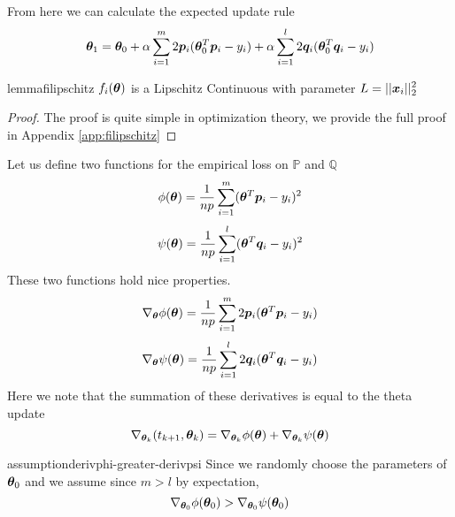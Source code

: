 \documentclass{article} %
\begin{document}
	From here we can calculate the expected update rule
	\begin{equation}
		{\bm{\theta}}_1 = {\bm{\theta}}_0 + \alpha\sum_{i=1}^m2{\bm{p}}_i({\bm{\theta}}^T_0{\bm{p}}_i -y_i) + \alpha\sum_{i=1}^l2{\bm{q}}_i({\bm{\theta}}^T_0{\bm{q}}_i - y_i)
	\end{equation}

	 
	
	\begin{restatable}{lemma}{filipschitz}
		\label{lem:filipschitz}
		$f_i({\bm{\theta}})$ is a Lipschitz Continuous with parameter $\displaystyle L = || {\bm{x}}_i || _2^2$
	\end{restatable}
	\begin{proof}
		The proof is quite simple in optimization theory, we provide the full proof in Appendix \ref{app:filipschitz}
	\end{proof}
	Let us define two functions for the empirical loss on $\mathbb{P}$ and $\mathbb{Q}$
	\begin{equation}
		\phi({\bm{\theta}}) = \frac{1}{np}\sum_{i=1}^m({\bm{\theta}}^T{\bm{p}}_i - y_i)^2
	\end{equation}
	\begin{equation}
		\psi({\bm{\theta}}) = \frac{1}{np}\sum_{i=1}^l({\bm{\theta}}^T{\bm{q}}_i - y_i)^2
	\end{equation}
	These two functions hold nice properties.
	\begin{equation}
		\nabla_{{\bm{\theta}}}\phi({\bm{\theta}}) = \frac{1}{np} \sum_{i=1}^m2{\bm{p}}_i ({\bm{\theta}}^T{\bm{p}}_i - y_i)
	\end{equation}
	\begin{equation}
		\nabla_{{\bm{\theta}}}\psi({\bm{\theta}}) = \frac{1}{np} \sum_{i=1}^l2{\bm{q}}_i({\bm{\theta}}^T{\bm{q}}_i - y_i)
	\end{equation}
	Here we note that the summation of these derivatives is equal to the theta update
	\begin{equation}
		\nabla_{{\bm{\theta}}_k}(t_{k+1},{\bm{\theta}}_k) = \nabla_{{\bm{\theta}}_k}\phi({\bm{\theta}}) + \nabla_{{\bm{\theta}}_k}\psi({\bm{\theta}})
	\end{equation}
	
	\begin{restatable}{assumption}{derivphi-greater-derivpsi}
		\label{asm:derivphi-greater-derivpsi}
		Since we randomly choose the parameters of ${\bm{\theta}}_0$ and we assume since $m > l$ by expectation,
		\begin{equation}
			\nabla_{{\bm{\theta}}_0}\phi({\bm{\theta}}_0) > \nabla_{{\bm{\theta}}_0}\psi({\bm{\theta}}_0)
		\end{equation}
	\end{restatable}	
	
\end{document}
